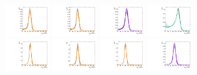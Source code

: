 \begin{figure}[htbp]
  \includegraphics[width=0.18\textwidth]{fig/2Dfit/templateSignalVsMX_fromDC_RadToWW_MJJ_mu_LP_nobb_LDy.pdf}
  \includegraphics[width=0.18\textwidth]{fig/2Dfit/templateSignalVsMX_fromDC_ZprToWW_MJJ_mu_LP_nobb_LDy.pdf}
  \includegraphics[width=0.18\textwidth]{fig/2Dfit/templateSignalVsMX_fromDC_WprToWZ_MJJ_mu_LP_nobb_LDy.pdf}
  \includegraphics[width=0.18\textwidth]{fig/2Dfit/templateSignalVsMX_fromDC_WprToWH_MJJ_mu_LP_nobb_LDy.pdf}\\
  \includegraphics[width=0.18\textwidth]{fig/2Dfit/templateSignalVsMX_fromDC_GbuToWW_MJJ_mu_HP_vbf_LDy.pdf}
  \includegraphics[width=0.18\textwidth]{fig/2Dfit/templateSignalVsMX_fromDC_RadToWW_MJJ_mu_HP_vbf_LDy.pdf}
  \includegraphics[width=0.18\textwidth]{fig/2Dfit/templateSignalVsMX_fromDC_ZprToWW_MJJ_mu_HP_vbf_LDy.pdf}
  \includegraphics[width=0.18\textwidth]{fig/2Dfit/templateSignalVsMX_fromDC_WprToWZ_MJJ_mu_HP_vbf_LDy.pdf}

\end{figure}
